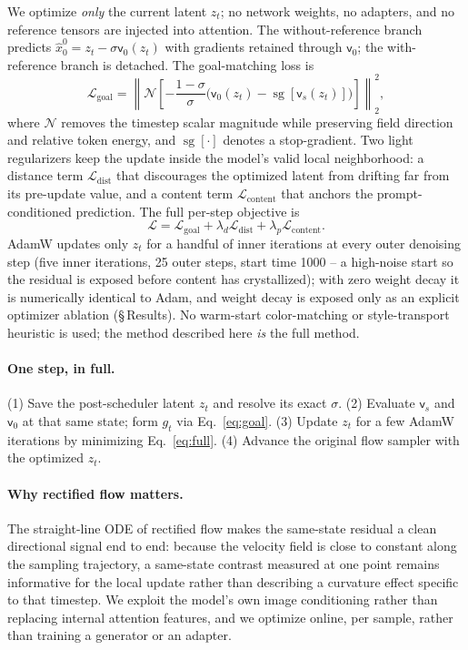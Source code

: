\documentclass[letterpaper]{article} %
\newcommand{\vel}{\mathsf{v}}
\newcommand{\sg}{\operatorname{sg}}
\begin{document}
We optimize \emph{only} the current latent $z_t$; no network weights, no
adapters, and no reference tensors are injected into attention. The
without-reference branch predicts $\hat x_0^0=z_t-\sigma\vel_0(z_t)$ with
gradients retained through $\vel_0$; the with-reference branch is detached. The
goal-matching loss is
\begin{equation}
 \mathcal L_{\mathrm{goal}}
 =\left\lVert\mathcal N\!\left[-\frac{1-\sigma}{\sigma}
 \big(\vel_0(z_t)-\sg[\vel_s(z_t)]\big)\right]\right\rVert_2^2,
 \label{eq:lgoal}
\end{equation}
where $\mathcal N$ removes the timestep scalar magnitude while preserving field
direction and relative token energy, and $\sg[\cdot]$ denotes a stop-gradient.
Two light regularizers keep the update inside the model's valid local
neighborhood: a distance term $\mathcal L_{\mathrm{dist}}$ that discourages the
optimized latent from drifting far from its pre-update value, and a content
term $\mathcal L_{\mathrm{content}}$ that anchors the prompt-conditioned
prediction. The full per-step objective is
\begin{equation}
 \mathcal L=\mathcal L_{\mathrm{goal}}
 +\lambda_d\mathcal L_{\mathrm{dist}}+\lambda_p\mathcal L_{\mathrm{content}}.
 \label{eq:full}
\end{equation}
AdamW updates only $z_t$ for a handful of inner iterations at every outer
denoising step (five inner iterations, 25 outer steps, start time 1000 -- a
high-noise start so the residual is exposed before content has crystallized);
with zero weight decay it is numerically identical to Adam, and weight decay
is exposed only as an explicit optimizer ablation (\S\,Results). No warm-start
color-matching or style-transport heuristic is used; the method described here
\emph{is} the full method.

\paragraph{One step, in full.} (1) Save the post-scheduler latent $z_t$ and
resolve its exact $\sigma$. (2) Evaluate $\vel_s$ and $\vel_0$ at that same
state; form $g_t$ via Eq.~\ref{eq:goal}. (3) Update $z_t$ for a few AdamW
iterations by minimizing Eq.~\ref{eq:full}. (4) Advance the original flow
sampler with the optimized $z_t$.

\paragraph{Why rectified flow matters.}
The straight-line ODE of rectified flow makes the same-state residual a clean
directional signal end to end: because the velocity field is close to constant
along the sampling trajectory, a same-state contrast measured at one point
remains informative for the local update rather than describing a curvature
effect specific to that timestep. We exploit the model's own image
conditioning rather than replacing internal attention features, and we
optimize online, per sample, rather than training a generator or an adapter.
\end{document}
